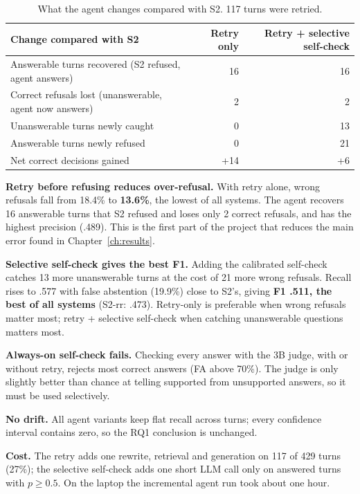 \documentclass[11pt,a4paper]{report}
\newcommand{\sys}[1]{\textsf{#1}}
\begin{document}
\begin{table}[H]
\centering\small
\begin{tabular}{@{}lrr@{}}
\toprule
Change compared with \sys{S2} & Retry only & Retry + selective self-check \\
\midrule
Answerable turns recovered (S2 refused, agent answers) & 16 & 16 \\
Correct refusals lost (unanswerable, agent now answers) & 2 & 2 \\
Unanswerable turns newly caught & 0 & 13 \\
Answerable turns newly refused & 0 & 21 \\
\midrule
Net correct decisions gained & +14 & +6 \\
\bottomrule
\end{tabular}
\caption{What the agent changes compared with \sys{S2}. 117 turns were retried.}
\label{tab:agentdelta}
\end{table}

\textbf{Retry before refusing reduces over-refusal.} With retry alone, wrong refusals fall from 18.4\% to \textbf{13.6\%}, the lowest of all systems. The agent recovers 16 answerable turns that \sys{S2} refused and loses only 2 correct refusals, and has the highest precision (.489). This is the first part of the project that reduces the main error found in Chapter~\ref{ch:results}.

\textbf{Selective self-check gives the best F1.} Adding the calibrated self-check catches 13 more unanswerable turns at the cost of 21 more wrong refusals. Recall rises to .577 with false abstention (19.9\%) close to \sys{S2}'s, giving \textbf{F1 .511, the best of all systems} (\sys{S2-rr}: .473). Retry-only is preferable when wrong refusals matter most; retry + selective self-check when catching unanswerable questions matters most.

\textbf{Always-on self-check fails.} Checking every answer with the 3B judge, with or without retry, rejects most correct answers (FA above 70\%). The judge is only slightly better than chance at telling supported from unsupported answers, so it must be used selectively.

\textbf{No drift.} All agent variants keep flat recall across turns; every confidence interval contains zero, so the RQ1 conclusion is unchanged.

\textbf{Cost.} The retry adds one rewrite, retrieval and generation on 117 of 429 turns (27\%); the selective self-check adds one short LLM call only on answered turns with $p \ge 0.5$. On the laptop the incremental agent run took about one hour.
\end{document}
